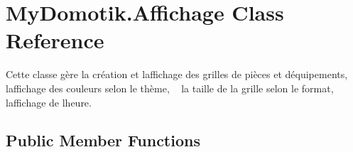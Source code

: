 \hypertarget{class_my_domotik_1_1_affichage}{}\section{My\+Domotik.\+Affichage Class Reference}
\label{class_my_domotik_1_1_affichage}


Cette classe gère la création et l\textquotesingle{}affichage des grilles de pièces et d\textquotesingle{}équipements, ~\newline
l\textquotesingle{}affichage des couleurs selon le thème, ~\newline
la taille de la grille selon le format, ~\newline
l\textquotesingle{}affichage de l\textquotesingle{}heure.  


\subsection*{Public Member Functions}
